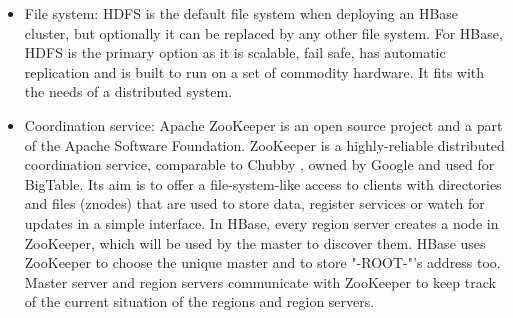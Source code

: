 \begin{itemize}
\item File system: HDFS \cite{ApacheHadoop, HDFSarchitecture} is the default file system when deploying an HBase cluster, but optionally it can be replaced by any other file system. For HBase, HDFS is the primary option as it is scalable, fail safe, has automatic replication and is built to run on a set of commodity hardware. It fits with the needs of a distributed system. 


\item Coordination service: Apache ZooKeeper \cite{ApacheZooKeeper, hunt2010zookeeper, junqueira2011zab} is an open source project and a part of the Apache Software Foundation. ZooKeeper is a highly-reliable distributed coordination service, comparable to Chubby \cite{burrows2006chubby}, owned by Google and used for BigTable. Its aim is to offer a file-system-like access to clients with directories and files (znodes) that are used to store data, register services or watch for updates in a simple interface. In HBase, every region server creates a node in ZooKeeper, which will be used by the master to discover them. HBase uses ZooKeeper to choose the unique master and to store "-ROOT-"'s address too.
Master server and region servers communicate with ZooKeeper to keep track of the current situation of the regions and region servers.
\end{itemize}
